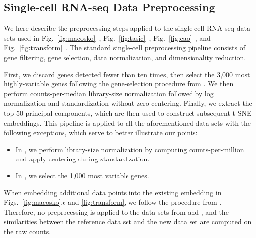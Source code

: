 \documentclass[article]{jss}
\begin{document}
\begin{appendix}

\section{Single-cell RNA-seq Data Preprocessing}

We here describe the preprocessing steps applied to the single-cell RNA-seq data sets used in Fig.~\ref{fig:macosko}~\citep{macosko2015highly}, Fig.~\ref{fig:tasic}~\citep{tasic2018shared}, Fig.~\ref{fig:cao}~\citep{cao2019single}, and Fig.~\ref{fig:transform}~\citep{hochgerner2018conserved}. The standard single-cell preprocessing pipeline consists of gene filtering, gene selection, data normalization, and dimensionality reduction.

First, we discard genes detected fewer than ten times, then select the 3,000 most highly-variable genes following the gene-selection procedure from \citet{kobak2019art}. We then perform counts-per-median library-size normalization followed by log normalization and standardization without zero-centering. Finally, we extract the top 50 principal components, which are then used to construct subsequent t-SNE embeddings. This pipeline is applied to all the aforementioned data sets with the following exceptions, which serve to better illustrate our points:
\begin{itemize}
  \item In \citet{macosko2015highly}, we perform library-size normalization by computing counts-per-million and apply centering during standardization.
  \item In \citet{hochgerner2018conserved}, we select the 1,000 most variable genes.
\end{itemize}

When embedding additional data points into the existing embedding in Figs.~\ref{fig:macosko}.c and \ref{fig:transform}, we follow the procedure from \citet{policar2021embedding}. Therefore, no preprocessing is applied to the data sets from \citet{shekhar2016comprehensive} and \citet{harris2018classes}, and the similarities between the reference data set and the new data set are computed on the raw counts.

\end{appendix}
\end{document}
